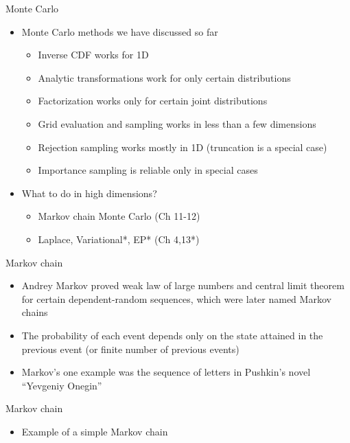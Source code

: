 \documentclass[finnish,english,t]{beamer}
\begin{document}
\begin{frame}{Monte Carlo}

  \begin{itemize}
  \item Monte Carlo methods we have discussed so far
    \begin{itemize}
    \item Inverse CDF works for 1D
    \item Analytic transformations work for only certain distributions
    \item Factorization works only for certain joint distributions
    \item Grid evaluation and sampling works in less than a few dimensions
    \item Rejection sampling works mostly in 1D (truncation is a special case)
    \item Importance sampling is reliable only in special cases
    \end{itemize}
    \pause
  \item What to do in high dimensions?
    \begin{itemize}
    \item Markov chain Monte Carlo (Ch 11-12)
    \item Laplace, Variational*, EP* (Ch 4,13*)
    \end{itemize}
  \end{itemize}
\end{frame}


\begin{frame}{Markov chain}

  \begin{itemize}
  \item<1-> Andrey Markov proved weak law of large numbers and central
    limit theorem for certain dependent-random sequences, which were
    later named Markov chains
  \item<2-> The probability of each event depends only on the state
    attained in the previous event (or finite number of previous events)
  \item<3-> Markov's one example was the sequence of letters in
    Pushkin's novel ``Yevgeniy Onegin''
  \end{itemize}

\end{frame}  

\begin{frame}{Markov chain}

  \begin{itemize}
  \item Example of a simple Markov chain
  \end{itemize}

\end{frame}  
\end{document}
